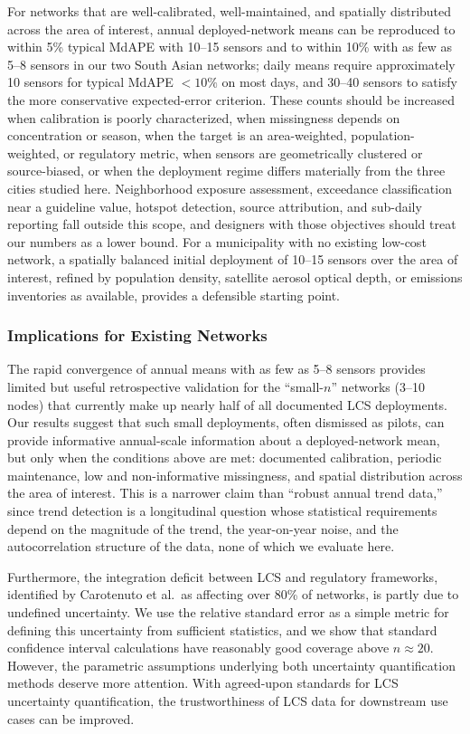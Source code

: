 \documentclass[12pt]{article}
\theoremstyle{remark}
\begin{document}
For networks that are well-calibrated, well-maintained, and spatially distributed across the area of interest, annual deployed-network means can be reproduced to within 5\% typical MdAPE with 10--15 sensors and to within 10\% with as few as 5--8 sensors in our two South Asian networks; daily means require approximately 10 sensors for typical MdAPE $<10\%$ on most days, and 30--40 sensors to satisfy the more conservative expected-error criterion. These counts should be increased when calibration is poorly characterized, when missingness depends on concentration or season, when the target is an area-weighted, population-weighted, or regulatory metric, when sensors are geometrically clustered or source-biased, or when the deployment regime differs materially from the three cities studied here. Neighborhood exposure assessment, exceedance classification near a guideline value, hotspot detection, source attribution, and sub-daily reporting fall outside this scope, and designers with those objectives should treat our numbers as a lower bound. For a municipality with no existing low-cost network, a spatially balanced initial deployment of 10--15 sensors over the area of interest, refined by population density, satellite aerosol optical depth, or emissions inventories as available, provides a defensible starting point.

\subsubsection{Implications for Existing Networks}

The rapid convergence of annual means with as few as 5--8 sensors provides limited but useful retrospective validation for the ``small-$n$'' networks (3--10 nodes) that currently make up nearly half of all documented LCS deployments.\supercite{carotenuto_low-cost_2023} Our results suggest that such small deployments, often dismissed as pilots, can provide informative annual-scale information about a deployed-network mean, but only when the conditions above are met: documented calibration, periodic maintenance, low and non-informative missingness, and spatial distribution across the area of interest. This is a narrower claim than ``robust annual trend data,'' since trend detection is a longitudinal question whose statistical requirements depend on the magnitude of the trend, the year-on-year noise, and the autocorrelation structure of the data, none of which we evaluate here.

Furthermore, the integration deficit between LCS and regulatory frameworks, identified by Carotenuto et al.\ as affecting over 80\% of networks, is partly due to undefined uncertainty.\supercite{carotenuto_low-cost_2023} We use the relative standard error as a simple metric for defining this uncertainty from sufficient statistics, and we show that standard confidence interval calculations have reasonably good coverage above $n \approx 20$. However, the parametric assumptions underlying both uncertainty quantification methods deserve more attention. With agreed-upon standards for LCS uncertainty quantification, the trustworthiness of LCS data for downstream use cases can be improved.
\end{document}

